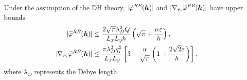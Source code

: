 \begin{lem} 
	Under the assumption of the DH theory, $|\widetilde{\varphi}^{\emph{RB}}(\bm{h})|$ and $|\nabla_{\bm{r}_i}\widetilde{\varphi}^{\emph{RB}}(\bm{h})|$ have upper bounds
	\begin{equation}
		\begin{split}
		\lvert \widetilde{\varphi}^{\emph{RB}}(\bm{h})\rvert & \leq \frac{2\sqrt{\pi}\lambda_D^2 Q}{L_xL_y h}\left(\sqrt{\pi}+\frac{\alpha \varepsilon}{h}\right),\\
		\lvert\nabla_{\bm{r}_{i}} \widetilde{\varphi}^{\emph{RB}}(\bm{h})\rvert & \leq  \frac{\pi \lambda_D^2 q_{i}^2}{L_xL_y}\left[3+\frac{\alpha}{\sqrt{\pi}}\left(1+\frac{2\sqrt{2}\varepsilon}{h}\right)\right], 
		\end{split}
	\end{equation}
	where $\lambda_{D}$ represents the Debye length.
	\label{lem::upper_bound_phiRB}
\end{lem}

